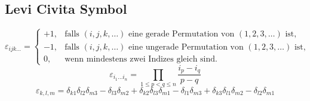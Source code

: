 \documentclass[11pt]{article}
\begin{document}
\subsection{Levi Civita Symbol}
\label{sec-13-3}
\begin{equation}
\varepsilon_{ijk \dots} =
\begin{cases}
+1, & \mbox{falls }(i,j,k,\dots) \mbox{ eine gerade Permutation von } (1,2,3,\dots) \mbox{ ist,} \\
-1, & \mbox{falls }(i,j,k,\dots) \mbox{ eine ungerade Permutation von } (1,2,3,\dots) \mbox{ ist,} \\
0,  & \mbox{wenn mindestens zwei Indizes gleich sind.}
\end{cases}
\end{equation}
\begin{equation}
\varepsilon_{i_1\dots i_n} =
\prod_{1\le p<q\le n} \frac{i_p-i_q}{p-q}
\end{equation}
\begin{equation}
\varepsilon_{k,l,m}=\delta_{k1}{\delta_{l2}\delta_{m3} - \delta_{l3}\delta_{m2}} + \delta_{k2}{\delta_{l3}\delta_{m1} - \delta_{l1}\delta_{m3}} + \delta_{k3}{\delta_{l1}\delta_{m2} - \delta_{l2}\delta_{m1}}
\end{equation}
\end{document}
